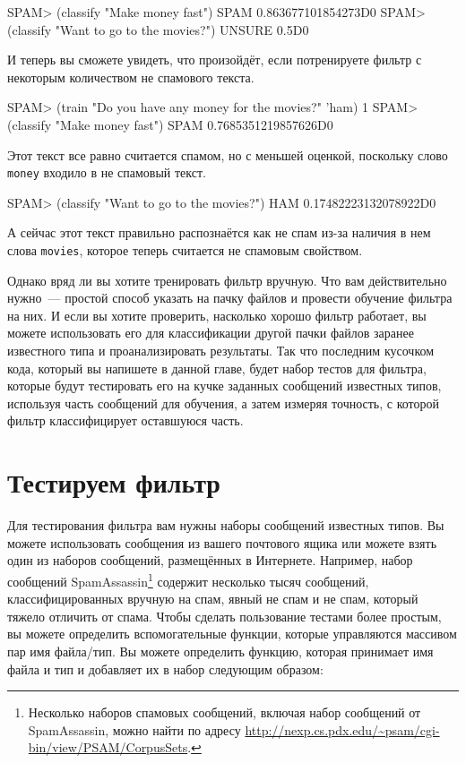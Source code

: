 \begin{myverb}
SPAM> (classify "Make money fast")
SPAM
0.863677101854273D0
SPAM> (classify "Want to go to the movies?")
UNSURE
0.5D0
\end{myverb}

И теперь вы сможете увидеть, что произойдёт, если потренируете фильтр с некоторым
количеством не спамового текста.

\begin{myverb}
SPAM> (train "Do you have any money for the movies?" 'ham)
1
SPAM> (classify "Make money fast")
SPAM
0.7685351219857626D0
\end{myverb}

Этот текст все равно считается спамом, но с меньшей оценкой, поскольку слово \lstinline{money}
входило в не спамовый текст.

\begin{myverb}
SPAM> (classify "Want to go to the movies?")
HAM
0.17482223132078922D0
\end{myverb}

А сейчас этот текст правильно распознаётся как не спам из-за наличия в нем слова
\lstinline{movies}, которое теперь считается не спамовым свойством.

Однако вряд ли вы хотите тренировать фильтр вручную.  Что вам действительно нужно~---
простой способ указать на пачку файлов и провести обучение фильтра на них.  И если вы
хотите проверить, насколько хорошо фильтр работает, вы можете использовать его для
классификации другой пачки файлов заранее известного типа и проанализировать результаты.
Так что последним кусочком кода, который вы напишете в данной главе, будет набор тестов
для фильтра, которые будут тестировать его на кучке заданных сообщений известных типов,
используя часть сообщений для обучения, а затем измеряя точность, с которой фильтр
классифицирует оставшуюся часть.

\section{Тестируем фильтр}

Для тестирования фильтра вам нужны наборы сообщений известных типов.  Вы можете
использовать сообщения из вашего почтового ящика или можете взять один из наборов
сообщений, размещённых в Интернете.  Например, набор сообщений
SpamAssassin\footnote{Несколько наборов спамовых сообщений, включая набор сообщений от
  SpamAssassin, можно найти по адресу
  \url{http://nexp.cs.pdx.edu/~psam/cgi-bin/view/PSAM/CorpusSets}.} содержит несколько
тысяч сообщений, классифицированных вручную на спам, явный не спам и не спам, который
тяжело отличить от спама.  Чтобы сделать пользование тестами более простым, вы можете
определить вспомогательные функции, которые управляются массивом пар имя файла/тип.  Вы
можете определить функцию, которая принимает имя файла и тип и добавляет их в набор
следующим образом:


